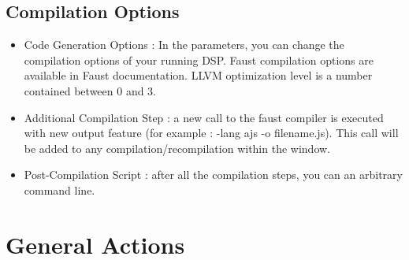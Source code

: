 \documentclass[a4paper]{article}
\begin{document}



\subsection{Compilation Options}

\begin{itemize}

\item Code Generation Options : In the parameters, you can change the compilation options of your running DSP. Faust compilation options are available in Faust documentation. LLVM optimization level is a number contained between 0 and 3. 

\item Additional Compilation Step : a new call to the faust compiler is executed with new output feature (for example : -lang ajs -o filename.js). This call will be added to any compilation/recompilation within the window.

\item Post-Compilation Script : after all the compilation steps, you can an arbitrary command line.

\end{itemize}

\section{General Actions}
\end{document}
